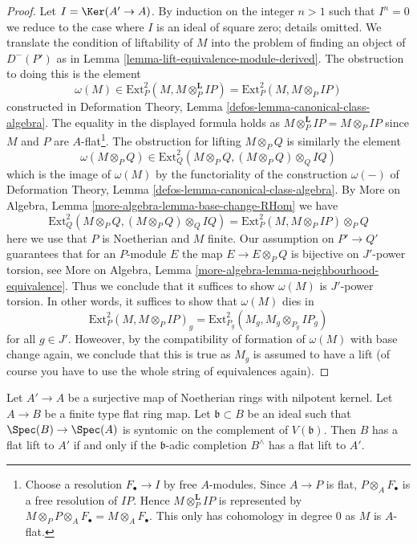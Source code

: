 \begin{proof}
Let $I = \Ker(A' \to A)$. By induction on the integer $n > 1$
such that $I^n = 0$ we reduce to the case where $I$ is an ideal
of square zero; details omitted.
We translate the condition of liftability of
$M$ into the problem of finding an object of $D^-(P')$ as in
Lemma \ref{lemma-lift-equivalence-module-derived}.
The obstruction to doing this is the element
$$
\omega(M) \in \text{Ext}^2_P(M, M \otimes_P^\mathbf{L} IP) =
\text{Ext}^2_P(M, M \otimes_P IP)
$$
constructed in
Deformation Theory, Lemma \ref{defos-lemma-canonical-class-algebra}.
The equality in the displayed formula holds as
$M \otimes_P^\mathbf{L} IP = M \otimes_P IP$
since $M$ and $P$ are $A$-flat\footnote{Choose a resolution
$F_\bullet \to I$ by free $A$-modules. Since $A \to P$ is flat,
$P \otimes_A F_\bullet$ is a free resolution of $IP$.
Hence $M \otimes_P^\mathbf{L} IP$ is represented by
$M \otimes_P P \otimes_A F_\bullet = M \otimes_A F_\bullet$.
This only has cohomology in degree $0$ as $M$ is $A$-flat.}.
The obstruction for lifting $M \otimes_P Q$ is similarly
the element
$$
\omega(M \otimes_P Q) \in
\text{Ext}^2_Q(M \otimes_P Q, (M \otimes_P Q) \otimes_Q IQ)
$$
which is the image of $\omega(M)$ by the functoriality
of the construction $\omega(-)$ of
Deformation Theory, Lemma \ref{defos-lemma-canonical-class-algebra}.
By More on Algebra, Lemma \ref{more-algebra-lemma-base-change-RHom}
we have
$$
\text{Ext}^2_Q(M \otimes_P Q, (M \otimes_P Q) \otimes_Q IQ) =
\text{Ext}^2_P(M, M \otimes_P IP) \otimes_P Q
$$
here we use that $P$ is Noetherian and $M$ finite.
Our assumption on $P' \to Q'$ guarantees that for an $P$-module $E$
the map $E \to E \otimes_P Q$ is bijective on $J'$-power torsion, see
More on Algebra, Lemma
\ref{more-algebra-lemma-neighbourhood-equivalence}.
Thus we conclude that it suffices to show $\omega(M)$
is $J'$-power torsion. In other words, it suffices to show that
$\omega(M)$ dies in
$$
\text{Ext}^2_P(M, M \otimes_P IP)_g =
\text{Ext}^2_{P_g}(M_g, M_g \otimes_{P_g} IP_g)
$$
for all $g \in J'$. Howeover, by the compatibility of formation of $\omega(M)$
with base change again, we conclude that this is true as $M_g$
is assumed to have a lift (of course you have to use the whole
string of equivalences again).
\end{proof}

\begin{lemma}
\label{lemma-lift-equivalence}
Let $A' \to A$ be a surjective map of Noetherian rings with nilpotent kernel.
Let $A \to B$ be a finite type flat ring map.
Let $\mathfrak b \subset B$ be an ideal such that
$\Spec(B) \to \Spec(A)$ is syntomic on the complement of $V(\mathfrak b)$.
Then $B$ has a flat lift to $A'$ if and only if the $\mathfrak b$-adic
completion $B^\wedge$ has a flat lift to $A'$.
\end{lemma}

